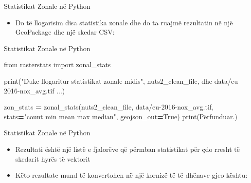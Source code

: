 \documentclass[
  ignorenonframetext,
]{beamer}
\newenvironment{Shaded}{\begin{snugshade}}{\end{snugshade}}
\newcommand{\BuiltInTok}[1]{#1}
\newcommand{\ImportTok}[1]{#1}
\newcommand{\NormalTok}[1]{#1}
\newcommand{\OperatorTok}[1]{\textcolor[rgb]{0.81,0.36,0.00}{\textbf{#1}}}
\newcommand{\StringTok}[1]{\textcolor[rgb]{0.31,0.60,0.02}{#1}}
\newcommand{\VariableTok}[1]{\textcolor[rgb]{0.00,0.00,0.00}{#1}}
\providecommand{\tightlist}{%
  \setlength{\itemsep}{0pt}\setlength{\parskip}{0pt}}
\begin{document}
\begin{frame}{Statistikat Zonale në Python}
\protect\hypertarget{statistikat-zonale-nuxeb-python-1}{}
\begin{itemize}
\tightlist
\item
  Do të llogarisim disa statistika zonale dhe do ta ruajmë rezultatin në
  një GeoPackage dhe një skedar CSV:
\end{itemize}
\end{frame}

\begin{frame}[fragile]{Statistikat Zonale në Python}
\protect\hypertarget{statistikat-zonale-nuxeb-python-2}{}

\begin{Shaded}
\begin{Highlighting}[]
\ImportTok{from}\NormalTok{ rasterstats }\ImportTok{import}\NormalTok{ zonal\_stats}

\BuiltInTok{print}\NormalTok{(}\StringTok{"Duke llogaritur statistikat zonale midis"}\NormalTok{, nuts2\_clean\_file, }\StringTok{\textquotesingle{}dhe data/eu{-}2016{-}nox\_avg.tif ...\textquotesingle{}}\NormalTok{)}

\NormalTok{zon\_stats }\OperatorTok{=}\NormalTok{ zonal\_stats(nuts2\_clean\_file, }\StringTok{\textquotesingle{}data/eu{-}2016{-}nox\_avg.tif\textquotesingle{}}\NormalTok{,}
\NormalTok{                        stats}\OperatorTok{=}\StringTok{"count min mean max median"}\NormalTok{, geojson\_out}\OperatorTok{=}\VariableTok{True}\NormalTok{)}
\BuiltInTok{print}\NormalTok{(}\StringTok{\textquotesingle{}Përfunduar.\textquotesingle{}}\NormalTok{)}
\end{Highlighting}
\end{Shaded}
\end{frame}

\begin{frame}{Statistikat Zonale në Python}
\protect\hypertarget{statistikat-zonale-nuxeb-python-3}{}
\begin{itemize}
\item
  Rezultati është një listë e fjalorëve që përmban statistikat për çdo
  rresht të skedarit hyrës të vektorit
\item
  Këto rezultate mund të konvertohen në një kornizë të të dhënave gjeo
  kështu:
\end{itemize}
\end{frame}
\end{document}
